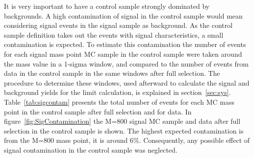 It is very important to have a control sample strongly dominated by backgrounds. A high contamination of signal in the control sample would mean considering signal events in the signal sample as background. As the control sample definition takes out the events with signal characteristics, a small contamination is expected. To estimate this contamination the number of events for each signal mass point MC sample in the control sample were taken around the \Tp mass value in a 1-sigma window, and compared to the number of events from data in the control sample in the same windows after full selection. The procedure to determine these windows, used afterward to calculate the signal and background yields for the limit calculation, is explained in section~\ref{sec:sys}. Table~\ref{tab:sigcontam} presents the total number of events for each MC mass point in the control sample after full selection and for data. In figure~\ref{fig:SigContamination} the M=800 \GeVcc signal MC sample and data after full selection in the control sample is shown. The highest expected contamination is from the M=800 \GeVcc mass point, it is around 6\%. Consequently, any possible effect of signal contamination in the control sample was neglected. 

\begin{table*}[htbH]
\begin{center}
\caption{Number of events in the control sample for MC signal samples and data after full selection in a window corresponding to one $\sigma$ for each mass point, as it will be explained in section~\ref{sec:sys}. The contamination is evaluated as the ratio of the number of events in the control sample for each mass point and data. \label{tab:sigcontam}}
\end{center}
\end{table*}

